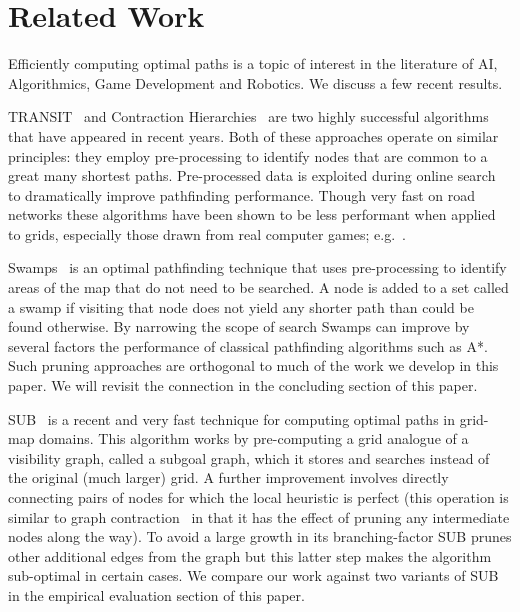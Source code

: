 \section{Related Work}
\label{sec::relatedwork}
Efficiently computing optimal paths is a topic of interest in the literature
of AI, Algorithmics, Game Development and Robotics. We discuss a few recent
results.

TRANSIT~\cite{bast06} and Contraction Hierarchies~\cite{geisberger08} are two
highly successful algorithms that have appeared in recent years.
Both of these approaches operate on similar principles: they
employ pre-processing to identify nodes that are common to a great many
shortest paths. Pre-processed data is exploited during online search to
dramatically improve pathfinding performance. Though very fast on road networks
these algorithms have been shown to be less performant when applied to grids,
especially those drawn from real computer games;
e.g.~\cite{sturtevant10,antsfeld12,storandt13}.

Swamps~\cite{pochter10} is an optimal pathfinding technique that uses
pre-processing to identify areas of the map that do not need to be searched. A
node is added to a set called a swamp if visiting that node does not yield any
shorter path than could be found otherwise. By narrowing the scope of search
Swamps can improve by several factors the performance of classical pathfinding
algorithms such as A{*}.  Such pruning approaches are orthogonal to much of
the work we develop in this paper. We will revisit the connection in the 
concluding section of this paper.

SUB~\cite{urasKH13} is a recent and very fast technique for computing optimal
paths in grid-map domains.  This algorithm works by pre-computing a grid
analogue of a visibility graph, called a subgoal graph, which it stores and
searches instead of the original (much larger) grid.  A further improvement
involves directly connecting pairs of nodes for which the local heuristic is
perfect (this operation is similar to graph contraction~\cite{geisberger08} in
that it has the effect of pruning any intermediate nodes along the way).  To
avoid a large growth in its branching-factor SUB prunes other additional edges
from the graph but this latter step makes the algorithm sub-optimal in certain
cases. We compare our work against two variants of SUB in the empirical
evaluation section of this paper.

